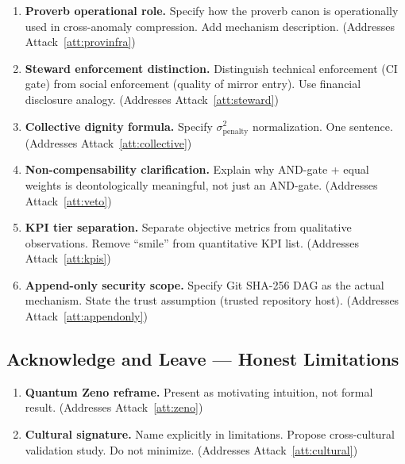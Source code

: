 \documentclass[12pt,a4paper]{article}
\theoremstyle{definition}
\begin{document}
\begin{enumerate}[label=\textbf{S\arabic*.},leftmargin=*]
\item \textbf{Proverb operational role.} Specify how the proverb canon is
  operationally used in cross-anomaly compression. Add mechanism description.
  (Addresses Attack~\ref{att:provinfra})

\item \textbf{Steward enforcement distinction.} Distinguish technical
  enforcement (CI gate) from social enforcement (quality of mirror entry).
  Use financial disclosure analogy.
  (Addresses Attack~\ref{att:steward})

\item \textbf{Collective dignity formula.} Specify $\sigma^2_\text{penalty}$
  normalization. One sentence.
  (Addresses Attack~\ref{att:collective})

\item \textbf{Non-compensability clarification.} Explain why AND-gate + equal
  weights is deontologically meaningful, not just an AND-gate.
  (Addresses Attack~\ref{att:veto})

\item \textbf{KPI tier separation.} Separate objective metrics from
  qualitative observations. Remove ``smile'' from quantitative KPI list.
  (Addresses Attack~\ref{att:kpis})

\item \textbf{Append-only security scope.} Specify Git SHA-256 DAG as the
  actual mechanism. State the trust assumption (trusted repository host).
  (Addresses Attack~\ref{att:appendonly})
\end{enumerate}

\subsection*{Acknowledge and Leave — Honest Limitations}

\begin{enumerate}[label=\textbf{A\arabic*.},leftmargin=*]
\item \textbf{Quantum Zeno reframe.} Present as motivating intuition,
  not formal result.
  (Addresses Attack~\ref{att:zeno})

\item \textbf{Cultural signature.} Name explicitly in limitations. Propose
  cross-cultural validation study. Do not minimize.
  (Addresses Attack~\ref{att:cultural})
\end{enumerate}
\end{document}

